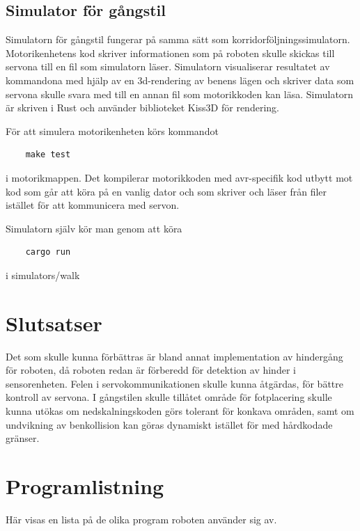 \documentclass[a4paper,titlepage,12pt]{article}
\begin{document}
	\subsection{Simulator för gångstil}
	Simulatorn för gångstil fungerar på samma sätt som
    korridorföljningssimulatorn. Motorikenhetens kod skriver informationen som
    på roboten skulle skickas till servona till en fil som simulatorn läser.
    Simulatorn visualiserar resultatet av kommandona med hjälp av en 3d-rendering 
	av benens lägen och skriver data som servona skulle svara med till en annan 
	fil som motorikkoden kan läsa. Simulatorn är skriven i Rust och använder 
	biblioteket Kiss3D för rendering.

	För att simulera motorikenheten körs kommandot 

	\begin{lstlisting}
	make test
	\end{lstlisting}

	i motorikmappen. Det kompilerar motorikkoden med avr-specifik kod utbytt mot
	kod som går att köra på en vanlig dator och som skriver och läser från filer 
	istället för att kommunicera med servon.

	Simulatorn själv kör man genom att köra
	\begin{lstlisting}
	cargo run
	\end{lstlisting}
	i simulators/walk

	\section{Slutsatser}
    Det som skulle kunna förbättras är bland annat implementation av hindergång
    för roboten, då roboten redan är förberedd för detektion av hinder i
    sensorenheten. Felen i servokommunikationen skulle kunna åtgärdas, för
    bättre kontroll av servona. I gångstilen skulle tillåtet område för 
    fotplacering skulle kunna utökas om nedskalningskoden görs tolerant för
    konkava områden, samt om undvikning av benkollision kan göras dynamiskt
    istället för med hårdkodade gränser.

	\appendix
	\section{Programlistning}
	Här visas en lista på de olika program roboten
	använder sig av.
	
\end{document}
